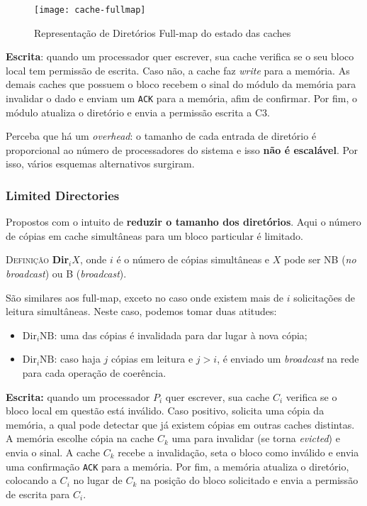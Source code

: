 \begin{figure}
  \centering
  \texttt{[image: cache-fullmap]}
  \caption{Representação de Diretórios Full-map do estado das caches}
  \label{fig:cache-fullmap}
\end{figure}

\textbf{Escrita}: quando um processador quer escrever, sua cache verifica se o seu bloco local tem permissão de escrita. Caso não, a cache faz \textit{write} para a memória. As demais caches que possuem o bloco recebem o sinal do módulo da memória para invalidar o dado e enviam um \texttt{ACK} para a memória, afim de confirmar. Por fim, o módulo atualiza o diretório e envia a permissão escrita a C3.

Perceba que há um \textit{overhead}: o tamanho de cada entrada de diretório é proporcional ao número de processadores do sistema e isso \textbf{não é escalável}. Por isso, vários esquemas alternativos surgiram.




\subsubsection{Limited Directories}
Propostos com o intuito de \textbf{reduzir o tamanho dos diretórios}. Aqui o número de cópias em cache simultâneas para um bloco particular é limitado.

\textsc{Definição} \textbf{Dir$_{i}X$}, onde $i$ é o número de cópias simultâneas e $X$ pode ser NB (\textit{no broadcast}) ou B (\textit{broadcast}).

São similares aos full-map, exceto no caso onde existem mais de $i$ solicitações de leitura simultâneas. Neste caso, podemos tomar duas atitudes:
\begin{itemize}
  \item $\text{Dir}_i\text{NB}$: uma das cópias é invalidada para dar lugar à nova cópia;

  \item $\text{Dir}_i\text{NB}$: caso haja $j$ cópias em leitura e $j > i$, é enviado um \textit{broadcast} na rede para cada operação de coerência.
\end{itemize}

\textbf{Escrita:} quando um processador $P_i$ quer escrever, sua cache $C_i$ verifica se o bloco local em questão está inválido. Caso positivo, solicita uma cópia da memória, a qual pode detectar que já existem cópias em outras caches distintas. A memória escolhe cópia na cache $C_k$ uma para invalidar (se torna \textit{evicted}) e envia o sinal. A cache $C_k$ recebe a invalidação, seta o bloco como inválido e envia uma confirmação \texttt{ACK} para a memória. Por fim, a memória atualiza o diretório, colocando a $C_i$ no lugar de $C_k$ na posição do bloco solicitado e envia a permissão de escrita para $C_i$.




